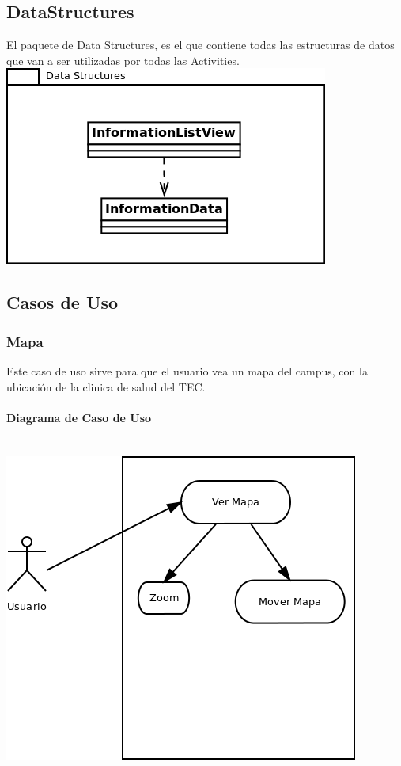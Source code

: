 \documentclass[12pt]{article}
\begin{document}
\subsection{DataStructures}
El paquete de Data Structures, es el que contiene todas las estructuras de datos que van a ser utilizadas por todas las Activities.\\
\includegraphics[scale=0.5]{"../Documentos/Diagramas/DS"}

\subsection{Casos de Uso}

\subsubsection{Mapa}
Este caso de uso sirve para que el usuario vea un mapa del campus, con la ubicaci\'on de la clinica de salud del TEC.

\paragraph{Diagrama de Caso de Uso}\ \\
\includegraphics[scale=0.6]{"../Documentos/Diagramas/CU1_"}
\end{document}
